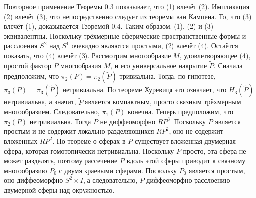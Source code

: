 \begin{myproof} 
Повторное применение Теоремы 0.3 показывает, что (1) влечёт (2). 
Импликация (2) влечёт (3), что непосредственно следует из теоремы ван Кампена. То, что 
(3) влечёт (1), доказывается Теоремой 0.4. Таким образом, (1), (2) и (3) эквивалентны.
Поскольку трёхмерные сферические пространственные формы и расслоения $S^{2}$ над $S^{1}$ 
очевидно являются простыми, (2) влечёт (4). Остаётся показать, что (4) влечёт (3).
Рассмотрим многообразие $M$, удовлетворяющее (4), простой фактор $P$ многообразия $M$, и его 
универсальное накрытие $\tilde{P}$.
Сначала предположим, что $\pi_{2} (P)=\pi_{2} (\tilde{P})$ тривиальна. Тогда, по гипотезе,
$\pi_{3} (P)=\pi_{3} (\tilde{P})$ нетривиальна. По теореме Хуревица это означает, что 
$H_{3} (\tilde{P})$ нетривиальна, а значит, $\tilde{P}$ является компактным, просто связным 
трёхмерным многообразием. Следовательно, $\pi_{1} (P)$ конечна.
Теперь предположим, что $\pi_{2} (P)$ нетривиальна. Тогда $P$ не диффеоморфно $RP^{3}$. 
Поскольку $P$ является простым и не содержит локально разделяющихся $RP^{2}$, оно не содержит 
вложенных $RP^{2}$. По теореме о сферах в $P$ существует вложенная двумерная сфера, которая 
гомотопически нетривиальна. Поскольку $P$ просто, эта сфера не может разделять, поэтому 
рассечение $P$ вдоль этой сферы приводит к связному многообразию $P_{0}$ с двумя краевыми сферами. 
Поскольку $P_{0}$ является простым, оно диффеоморфно $S^{2} \times I$, а следовательно, 
$P$ диффеоморфно расслоению двумерной сферы над окружностью.
\end{myproof}


